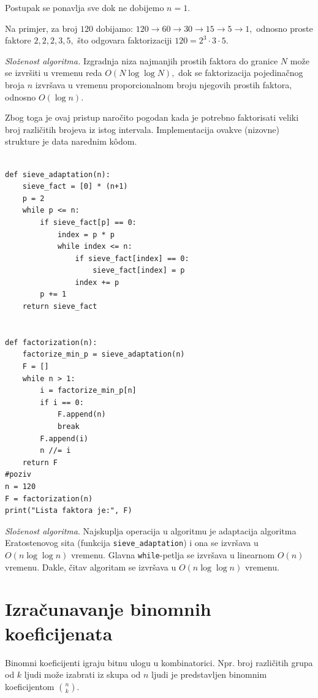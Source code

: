 Postupak se ponavlja sve dok ne dobijemo $n=1$.

\medskip

Na primjer, za broj $120$ dobijamo: $
120 \rightarrow 60 \rightarrow 30 \rightarrow 15 \rightarrow 5 \rightarrow 1,$ odnosno proste faktore $2,2,2,3,5,$ što odgovara faktorizaciji $
120 = 2^3 \cdot 3 \cdot 5.$

\medskip

\textit{Složenost algoritma.} Izgradnja niza najmanjih prostih faktora do granice $N$ može se izvršiti u vremenu reda $O(N \log \log N),$  dok se faktorizacija pojedinačnog broja $n$ izvršava u vremenu proporcionalnom broju njegovih prostih faktora, odnosno $O(\log n).$

Zbog toga je ovaj pristup naročito pogodan kada je potrebno faktorisati veliki broj različitih brojeva iz istog intervala. Implementacija ovakve (nizovne) strukture je data narednim k\^odom. 
 
 \begin{verbatim}
 
def sieve_adaptation(n):
    sieve_fact = [0] * (n+1)
    p = 2
    while p <= n:
        if sieve_fact[p] == 0:
            index = p * p
            while index <= n:
                if sieve_fact[index] == 0:
                    sieve_fact[index] = p
                index += p
        p += 1
    return sieve_fact


def factorization(n):
    factorize_min_p = sieve_adaptation(n)
    F = []
    while n > 1:
        i = factorize_min_p[n]
        if i == 0:
            F.append(n)
            break
        F.append(i)
        n //= i
    return F
#poziv
n = 120
F = factorization(n)
print("Lista faktora je:", F)
\end{verbatim} 
 
\textit{Složenost algoritma}. Najskuplja operacija u algoritmu je ada\-ptacija algoritma Eratostenovog sita (funkcija \texttt{sieve\_adaptation}) i ona se izvršava u $O(n \log \log n)$ vremenu. Glavna \texttt{while}-petlja se izvršava u linearnom $O(n)$ vremenu. Dakle, čitav algoritam se izvršava u 
 $O(n \log \log n)$ vremenu.
 
  \section{Izračunavanje binomnih koeficijenata} 
  
  Binomni koeficijenti igraju bitnu ulogu u kombinatorici. Npr. broj različitih grupa od $k$ ljudi može izabrati iz skupa od $n$ ljudi je predstavljen binomnim koeficijentom $\binom{n}{k}$. 
  
